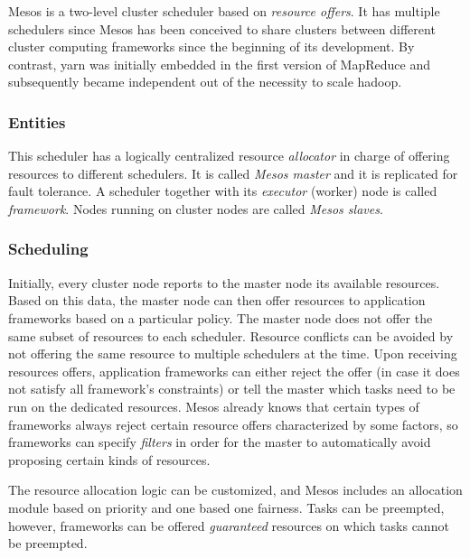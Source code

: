 
Mesos \cite{mesos} is a two-level cluster scheduler based on \textit{resource offers}.
It has multiple schedulers since Mesos \cite{mesos} has been conceived to share clusters between different cluster computing frameworks since the beginning of its development.
By contrast, \glsdesc{yarn} was initially embedded in the first version of MapReduce \cite{mapreduce} and subsequently became independent out of the necessity to scale \glsdesc{hadoop}.

\subsubsection{Entities}
This scheduler has a logically centralized resource \textit{allocator} in charge of offering resources to different schedulers.
It is called \textit{Mesos master} and it is replicated for fault tolerance.
A scheduler together with its \textit{executor} (worker) node is called \textit{framework}.
Nodes running on cluster nodes are called \textit{Mesos slaves}.

\subsubsection{Scheduling}
Initially, every cluster node reports to the master node its available resources.
Based on this data, the master node can then offer resources to application frameworks based on a particular policy.
The master node does not offer the same subset of resources to each scheduler.
Resource conflicts can be avoided by not offering the same resource to multiple schedulers at the time.
Upon receiving resources offers, application frameworks can either reject the offer (in case it does not satisfy all framework's constraints) or tell the master which tasks need to be run on the dedicated resources.
Mesos \cite{mesos} already knows that certain types of frameworks always reject certain resource offers characterized by some factors, so frameworks can specify \textit{filters} in order for the master to automatically avoid proposing certain kinds of resources.\par
The resource allocation logic can be customized, and Mesos \cite{mesos} includes an allocation module based on priority and one based one fairness.
Tasks can be preempted, however, frameworks can be offered \textit{guaranteed} resources on which tasks cannot be preempted.



